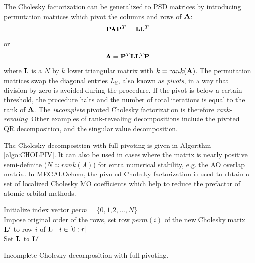 The Cholesky factorization can be generalized to PSD matrices by introducing permutation matrices which pivot the columns and rows of $\mathbf{A}$:
\begin{equation}
\mathbf{P} \mathbf{A} \mathbf{P}^T = \mathbf{L} \mathbf{L}^T 
\end{equation}
\noindent or
\begin{equation}
\mathbf{A} = \mathbf{P}^T \mathbf{L} \mathbf{L}^T \mathbf{P}
\end{equation}
\noindent where $\mathbf{L}$ is a $N$ by $k$ lower triangular matrix with $k = rank(\mathbf{A})$. The 
permutation matrices swap the diagonal entries $L_{ii}$, also known as \emph{pivots}, in a way that division by zero is avoided during the procedure. If the pivot is below a certain threshold, the procedure halts and the number of total iterations is equal to the rank of $\mathbf{A}$. The \emph{incomplete} pivoted Cholesky factorization is therefore \emph{rank-revaling}. Other examples of rank-revealing decompositions include the pivoted QR decomposition, and the singular value decomposition.

The Cholesky decomposition with full pivoting is given in Algorithm \ref{algo:CHOLPIV}. It can also be used in cases where the matrix is nearly positive semi-definite ($N \approx rank(A)$) for extra numerical stability, e.g. the AO overlap matrix. In MEGALOchem, the pivoted Cholesky factorization is used to obtain a set of localized Cholesky MO coefficients which help to reduce the prefactor of atomic orbital methods. 

\begin{algorithm}
Initialize index vector $perm = \{0,1,2,...,N\}$
\\
Impose original order of the rows, set row $perm(i)$ of the new Cholesky marix $\mathbf{L}'$ to row $i$ of $\mathbf{L} \quad i \in [0:r]$
\\
Set $\mathbf{L}$ to $\mathbf{L}'$

\caption{Incomplete Cholesky decomposition with full pivoting.}
\label{algo:CHOLPIV}
\end{algorithm}

